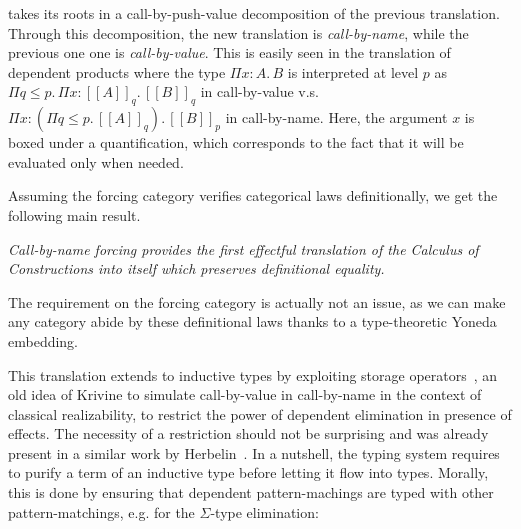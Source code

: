 \documentclass{easychair}
\newcommand{\interp}[1]{[\![#1]\!]}
\begin{document}
  takes its roots in a call-by-push-value \cite{Levy01} decomposition of the previous translation. Through this decomposition, the new translation is \emph{call-by-name}, while the previous one one is \emph{call-by-value}. This is easily seen in the translation of dependent products where the type $\Pi x : A.\, B$ is interpreted at level $p$ as $\Pi q \le p.\, \Pi x : \interp{A}_q.\, \interp{B}_q$ in call-by-value v.s. $\Pi x : (\Pi q \le p.\, \interp{A}_q).\, \interp{B}_p$ in call-by-name. Here, the argument $x$ is boxed under a quantification, which corresponds to the fact that it will be evaluated only when needed.

  Assuming the forcing category verifies categorical laws definitionally, we get the following main result.
  \begin{center}
    \emph{{Call-by-name forcing provides the first effectful translation of the Calculus of Constructions into itself which preserves definitional equality.}}
  \end{center}
  The requirement on the forcing category is actually not an issue, as we can make any category abide by these definitional laws thanks to a type-theoretic Yoneda embedding.
  
  This translation extends to inductive types by exploiting storage operators~\cite{Krivine94}, an old idea of Krivine to simulate call-by-value in call-by-name in the context of classical realizability, to restrict the power of dependent elimination in presence of effects. The necessity of a restriction should not be surprising and was already present in a similar work by Herbelin~\cite{Herbelin12}. In a nutshell, the typing system requires to purify a term of an inductive type before letting it flow into types. Morally, this is done by ensuring that dependent pattern-machings are typed with other pattern-matchings, e.g. for the $\Sigma$-type elimination:
  \begin{center}
  \mbox{}%
  \end{center}
\end{document}
